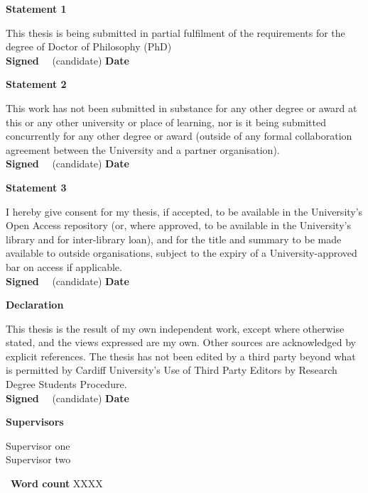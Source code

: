 \newpage\thispagestyle{empty}\cleardoublepage

\thispagestyle{plain}

\textbf{\large Statement 1}

This thesis is being submitted in partial fulfilment of the requirements for the degree of Doctor of Philosophy (PhD)\\
\textbf{Signed} \ \dotfill \ (candidate) \hspace*{1em} \textbf{Date}\ \ \ \dotfill

\textbf{\large Statement 2}

This work has not been submitted in substance for any other degree or award at this or any other university or place of learning, nor is it being submitted concurrently for any other degree or award (outside of any formal collaboration agreement between the University and a partner organisation).\\
\textbf{Signed} \ \dotfill \ (candidate) \hspace*{1em} \textbf{Date}\ \ \ \dotfill

\textbf{\large Statement 3}

I hereby give consent for my thesis, if accepted, to be available in the University's Open Access repository (or, where approved, to be available in the University's library and for inter-library loan), and for the title and summary to be made available to outside organisations, subject to the expiry of a University-approved bar on access if applicable.\\
\textbf{Signed} \ \dotfill \ (candidate) \hspace*{1em} \textbf{Date}\ \ \ \dotfill

\textbf{\large Declaration}

This thesis is the result of my own independent work, except where otherwise stated, and the views expressed are my own. Other sources are acknowledged by explicit references. The thesis has not been edited by a third party beyond what is permitted by Cardiff University's Use of Third Party Editors by Research Degree Students Procedure.\\
\textbf{Signed} \ \dotfill \ (candidate) \hspace*{1em} \textbf{Date}\ \ \ \dotfill

\vfill

\textbf{Supervisors} \ \parbox[t]{0.5\linewidth}{Supervisor one\\Supervisor two}  \ \hfill \textbf{Word count} XXXX
